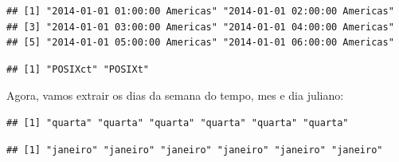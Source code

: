\documentclass[]{book}
\newenvironment{Shaded}{\begin{snugshade}}{\end{snugshade}}
\newcommand{\KeywordTok}[1]{\textcolor[rgb]{0.13,0.29,0.53}{\textbf{#1}}}
\newcommand{\StringTok}[1]{\textcolor[rgb]{0.31,0.60,0.02}{#1}}
\newcommand{\OperatorTok}[1]{\textcolor[rgb]{0.81,0.36,0.00}{\textbf{#1}}}
\newcommand{\NormalTok}[1]{#1}
\theoremstyle{definition}
\theoremstyle{definition}
\theoremstyle{definition}
\theoremstyle{remark}
\begin{document}
\begin{verbatim}
## [1] "2014-01-01 01:00:00 Americas" "2014-01-01 02:00:00 Americas"
## [3] "2014-01-01 03:00:00 Americas" "2014-01-01 04:00:00 Americas"
## [5] "2014-01-01 05:00:00 Americas" "2014-01-01 06:00:00 Americas"
\end{verbatim}

\begin{Shaded}
\end{Shaded}

\begin{verbatim}
## [1] "POSIXct" "POSIXt"
\end{verbatim}

Agora, vamos extrair os dias da semana do tempo, mes e dia juliano:

\begin{Shaded}
\end{Shaded}

\begin{verbatim}
## [1] "quarta" "quarta" "quarta" "quarta" "quarta" "quarta"
\end{verbatim}

\begin{Shaded}
\end{Shaded}

\begin{verbatim}
## [1] "janeiro" "janeiro" "janeiro" "janeiro" "janeiro" "janeiro"
\end{verbatim}

\begin{Shaded}
\end{Shaded}
\end{document}
